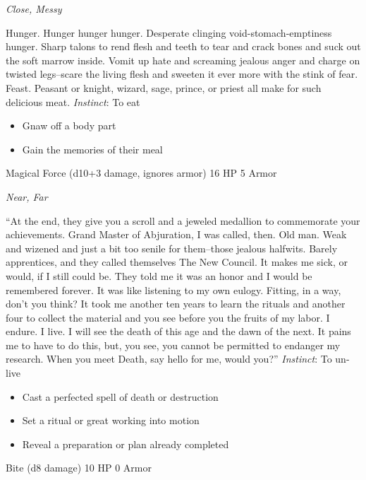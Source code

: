 \emph{Close, Messy}

\HRule
Hunger. Hunger hunger hunger. Desperate clinging void-stomach-emptiness hunger. Sharp talons to rend flesh and teeth to tear and crack bones and suck out the soft marrow inside. Vomit up hate and screaming jealous anger and charge on twisted legs--scare the living flesh and sweeten it ever more with the stink of fear. Feast. Peasant or knight, wizard, sage, prince, or priest all make for such delicious meat. \emph{Instinct}: To eat
\begin{itemize}
\item Gnaw off a body part
\item Gain the memories of their meal
\end{itemize}

\HRule
{}

Magical Force (d10+3 damage, ignores armor)\hspace*{\fill} 16 HP 5 Armor

\emph{Near, Far}

\HRule
``At the end, they give you a scroll and a jeweled medallion to commemorate your achievements. Grand Master of Abjuration, I was called, then. Old man. Weak and wizened and just a bit too senile for them--those jealous halfwits. Barely apprentices, and they called themselves The New Council. It makes me sick, or would, if I still could be. They told me it was an honor and I would be remembered forever. It was like listening to my own eulogy. Fitting, in a way, don't you think? It took me another ten years to learn the rituals and another four to collect the material and you see before you the fruits of my labor. I endure. I live. I will see the death of this age and the dawn of the next. It pains me to have to do this, but, you see, you cannot be permitted to endanger my research. When you meet Death, say hello for me, would you?'' \emph{Instinct}: To un-live
\begin{itemize}
\item Cast a perfected spell of death or destruction
\item Set a ritual or great working into motion
\item Reveal a preparation or plan already completed
\end{itemize}

\HRule
{}

Bite (d8 damage)\hspace*{\fill} 10 HP 0 Armor

